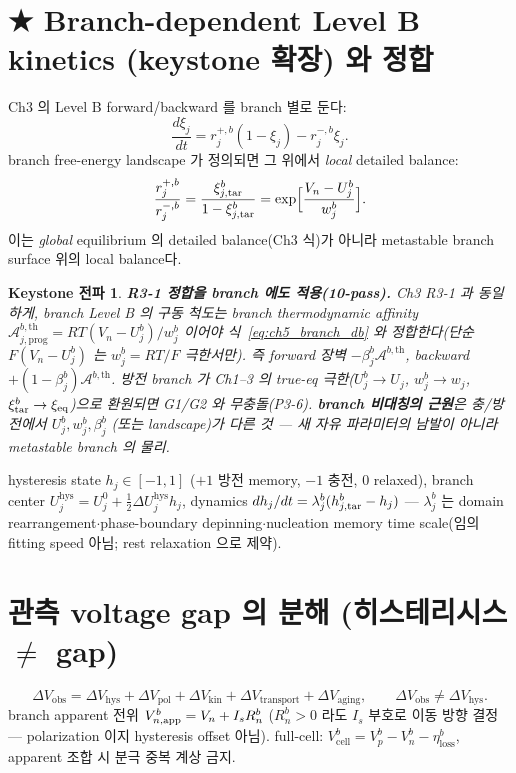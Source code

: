 \documentclass[11pt,a4paper]{article}
\newtheorem*{keybox}{Keystone 전파}
\newcommand{\cell}{\mathrm{cell}}\newcommand{\OCV}{\mathrm{OCV}}\newcommand{\ct}{\mathrm{ct}}
\newcommand{\hys}{\mathrm{hys}}\newcommand{\pol}{\mathrm{pol}}\newcommand{\AL}[1]{\textsf{[AL-#1]}}
\begin{document}
\section{★ Branch-dependent Level B kinetics (keystone 확장) 와 정합}\label{sec:ch5_levelB}
Ch3 의 Level B forward/backward 를 branch 별로 둔다:
\begin{equation}
\frac{d\xi_j}{dt}=r_j^{+,b}(1-\xi_j)-r_j^{-,b}\xi_j .
\label{eq:ch5_fb}
\end{equation}
branch free-energy landscape 가 정의되면 그 위에서 \emph{local} detailed balance:
\begin{equation}
\frac{r_j^{+,b}}{r_j^{-,b}}=\frac{\xi_{j,\mathrm{tar}}^b}{1-\xi_{j,\mathrm{tar}}^b}=\exp\!\Big[\frac{V_n-U_j^b}{w_j^b}\Big].
\label{eq:ch5_branch_db}
\end{equation}
이는 \emph{global} equilibrium 의 detailed balance(Ch3 식)가 아니라 metastable branch surface 위의
local balance다.
\begin{keybox}
\textbf{R3-1 정합을 branch 에도 적용(10-pass).} Ch3 R3-1 과 동일하게, branch Level B 의 구동 척도는
branch \emph{thermodynamic} affinity $\mathcal A_{j,\mathrm{prog}}^{b,\mathrm{th}}=RT(V_n-U_j^b)/w_j^b$
이어야 식~\eqref{eq:ch5_branch_db} 와 정합한다(단순 $F(V_n-U_j^b)$ 는 $w_j^b=RT/F$ 극한서만). 즉
forward 장벽 $-\beta_j^b\mathcal A^{b,\mathrm{th}}$, backward $+(1-\beta_j^b)\mathcal A^{b,\mathrm{th}}$.
방전 branch 가 Ch1--3 의 true-eq 극한($U_j^b\to U_j$, $w_j^b\to w_j$, $\xi_{\mathrm{tar}}^b\to\xi_{\mathrm{eq}}$)으로
환원되면 G1/G2 와 무충돌(P3-6). \textbf{branch 비대칭의 근원}은 충/방전에서 $U_j^b,w_j^b,\beta_j^b$
(또는 landscape)가 다른 것 — \emph{새 자유 파라미터의 남발이 아니라} metastable branch 의 물리.
\end{keybox}
hysteresis state $h_j\in[-1,1]$ ($+1$ 방전 memory, $-1$ 충전, $0$ relaxed), branch center
$U_j^\hys=U_j^0+\tfrac12\Delta U_j^\hys h_j$, dynamics $dh_j/dt=\lambda_j^b(h_{j,\mathrm{tar}}^b-h_j)$ — $\lambda_j^b$ 는
domain rearrangement$\cdot$phase-boundary depinning$\cdot$nucleation memory time scale(임의 fitting speed
아님; rest relaxation 으로 제약).

\section{관측 voltage gap 의 분해 (히스테리시스 $\ne$ gap)}\label{sec:ch5_gap}
\begin{equation}
\Delta V_\mathrm{obs}=\Delta V_\hys+\Delta V_\pol+\Delta V_\mathrm{kin}+\Delta V_\mathrm{transport}+\Delta V_\mathrm{aging},
\qquad \boxed{\Delta V_\mathrm{obs}\ne\Delta V_\hys.}
\label{eq:ch5_gap}
\end{equation}
branch apparent 전위 $V_{n,\mathrm{app}}^b=V_n+I_s R_n^b$ ($R_n^b>0$ 라도 $I_s$ 부호로 이동 방향 결정 —
polarization 이지 hysteresis offset 아님). full-cell: $V_\cell^b=V_p^b-V_n^b-\eta_\mathrm{loss}^b$, apparent
조합 시 분극 중복 계상 금지.
\end{document}
